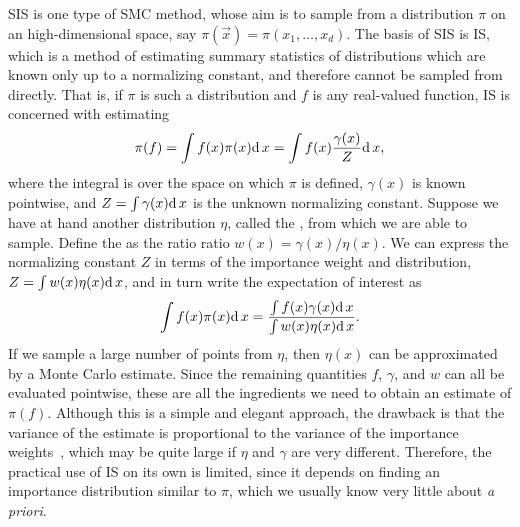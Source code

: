 \Gls{SIS} is one type of \gls{SMC} method, whose aim is to sample from a
distribution $\pi$ on an high-dimensional space, say $\pi(\vec{x}) = \pi(x_1,
\ldots, x_d)$. The basis of \gls{SIS} is \gls{IS}, which is a method of
estimating summary statistics of distributions which are known only up to a
normalizing constant, and therefore cannot be sampled from directly. That is,
if $\pi$ is such a distribution and $f$ is any real-valued function, \gls{IS}
is concerned with estimating
\[
  \pi(f) = \int f(x)\pi(x)\mathrm{d}\, x = \int f(x) \frac{\gamma(x)}{Z} \mathrm{d}\, x,
\]
where the integral is over the space on which $\pi$ is defined, $\gamma(x)$ is
known pointwise, and $Z = \int \gamma(x) \mathrm{d}\, x$ is the unknown normalizing
constant. Suppose we have at hand another distribution $\eta$, called the
, from which we are able to sample. Define the
 as the ratio ratio $w(x) = \gamma(x)/\eta(x)$. We can
express the normalizing constant $Z$ in terms of the importance weight and
distribution, $Z = \int w(x) \eta(x) \mathrm{d}\, x$, and in turn write the expectation
of interest as
\[
  \int f(x) \pi(x) \mathrm{d}\, x = \frac{\int f(x) \gamma(x) \mathrm{d}\, x}
                               {\int w(x) \eta(x) \mathrm{d}\, x}.
\]
If we sample a large number of points from $\eta$, then $\eta(x)$ can be
approximated by a Monte Carlo estimate. Since the remaining quantities $f$,
$\gamma$, and $w$ can all be evaluated pointwise, these are all the ingredients
we need to obtain an estimate of $\pi(f)$. Although this is a simple and
elegant approach, the drawback is that the variance of the estimate is
proportional to the variance of the importance weights~\autocite{liu2008monte},
which may be quite large if $\eta$ and $\gamma$ are very different. Therefore,
the practical use of \gls{IS} on its own is limited, since it depends on
finding an importance distribution similar to $\pi$, which we usually know very
little about \textit{a priori}.

